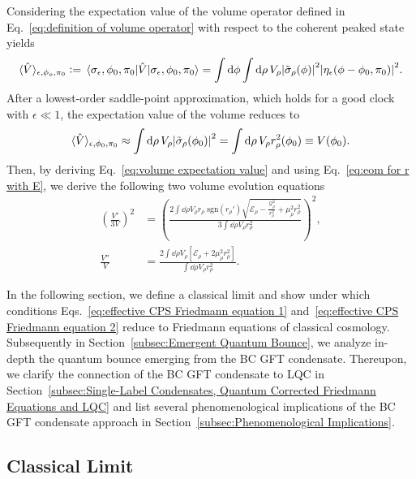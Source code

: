 \documentclass[11pt,a4paper]{article}
\newcommand{\defeq}{\vcentcolon=}
\begin{document}
Considering the expectation value of the volume operator defined in Eq.~\eqref{eq:definition of volume operator} with respect to the coherent peaked state yields
%
\begin{equation}
\langle\hat{V}\rangle_{\epsilon,\phi_o,\pi_0}
\defeq
\expval{\hat{V}}{\sigma_{\epsilon},\phi_0,\pi_0}
=
\int\dd{\phi}\int\dd{\rho}V_{\rho}\abs{\tilde{\sigma}_{\rho}(\phi)}^2\abs{\eta_{\epsilon}(\phi-\phi_0,\pi_0)}^2.
\end{equation}
%
After a lowest-order saddle-point approximation, which holds for a good clock with $\epsilon\ll 1$, the expectation value of the volume reduces to~\cite{Marchetti:2020umh}
%
\begin{equation}\label{eq:volume expectation value}
\langle\hat{V}\rangle_{\epsilon,\phi_0,\pi_0}
\approx
\int\dd{\rho}V_{\rho}\abs{\tilde{\sigma}_{\rho}(\phi_0)}^2
=
\int\dd{\rho}V_{\rho}r_{\rho}^2(\phi_0)
\equiv
V(\phi_0).
\end{equation}
%
Then, by deriving Eq.~\eqref{eq:volume expectation value} and using Eq.~\eqref{eq:eom for r with E}, we derive the following two volume evolution equations
%
\begin{align}
\left(\frac{V'}{3V}\right)^2
& =
\left(\frac{2\int\dd{\rho}V_{\rho}r_{\rho}\;\text{sgn}(r_{\rho}')\sqrt{\mathcal{E}_{\rho}-\frac{\mathcal{Q}_{\rho}^2}{r_{\rho}^2}+\mu_{\rho}^2r_{\rho}^2}}{3\int\dd{\rho}V_{\rho}r_{\rho}^2}\right)^2,\label{eq:effective CPS Friedmann equation 1}\\[7pt]
\frac{V''}{V}
& =
\frac{2\int\dd{\rho}V_{\rho}\left[\mathcal{E}_{\rho}+2\mu_{\rho}^2r_{\rho}^2\right]}{\int\dd{\rho}V_{\rho}r_{\rho}^2}.\label{eq:effective CPS Friedmann equation 2}
\end{align} 
%

In the following section, we define a classical limit and show under which conditions Eqs.~\eqref{eq:effective CPS Friedmann equation 1} and~\eqref{eq:effective CPS Friedmann equation 2} reduce to Friedmann equations of classical cosmology. Subsequently in Section~\ref{subsec:Emergent Quantum Bounce}, we analyze in-depth the quantum bounce emerging from the BC GFT condensate. Thereupon, we clarify the connection of the BC GFT condensate to LQC in Section~\ref{subsec:Single-Label Condensates, Quantum Corrected Friedmann Equations and LQC} and list several phenomenological implications of the BC GFT condensate approach in Section~\ref{subsec:Phenomenological Implications}.

\subsection{Classical Limit}\label{subsec:Classical Limit}
\end{document}
